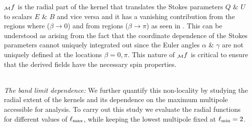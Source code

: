 ${_{\mathcal{M}}f}$ is the radial part of the kernel that translates the Stokes parameters $Q$ \& $U$ to scalars $E$ \& $B$ and vice versa and it has a vanishing contribution from the regions where ($\beta \rightarrow 0$) and from regions ($\beta \rightarrow \pi$) as seen in . This can be understood as arising from the fact that the coordinate dependence of the Stokes parameters cannot uniquely integrated out since the Euler angles $\alpha$ \& $\gamma$ are not uniquely defined at the locations $\beta=0,\pi$. This nature of ${_{\mathcal{M}}f}$ is critical to ensure that the derived fields have the necessary spin properties.

\\ \linebreak
\noindent \textit{The band limit dependence:} 
We further quantify this non-locality by studying the radial extent of the kernels and its dependence on the maximum multipole accessible for analysis. To carry out this study we evaluate the radial functions for different values of $\ell_{\rm max}$, while keeping the lowest multipole fixed at $\ell_{\rm min}=2$. 

